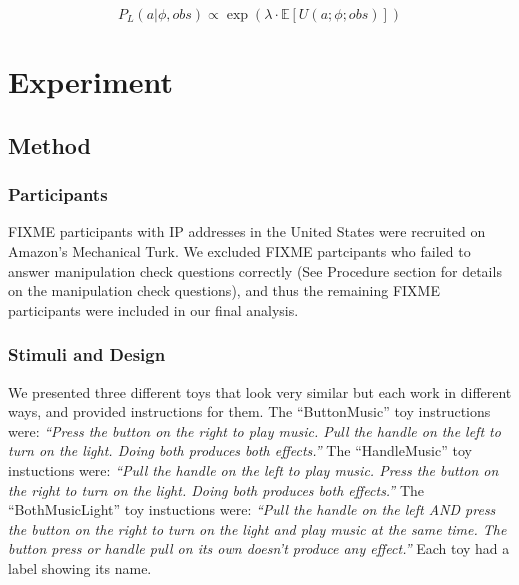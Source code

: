 \documentclass[10pt, letterpaper]{article}
\begin{document}
\[ P_L(a | \phi, obs) \propto \exp(\lambda \cdot \mathbb{E}[U(a;\phi; obs)])\]

\section{Experiment}\label{experiment}

\subsection{Method}\label{method}

\subsubsection{Participants}\label{participants}

FIXME participants with IP addresses in the United States were recruited
on Amazon's Mechanical Turk. We excluded FIXME partcipants who failed to
answer manipulation check questions correctly (See Procedure section for
details on the manipulation check questions), and thus the remaining
FIXME participants were included in our final analysis.

\subsubsection{Stimuli and Design}\label{stimuli-and-design}

We presented three different toys that look very similar but each work
in different ways, and provided instructions for them. The
``ButtonMusic'' toy instructions were: \emph{``Press the button on the
right to play music. Pull the handle on the left to turn on the light.
Doing both produces both effects.''} The ``HandleMusic'' toy instuctions
were: \emph{``Pull the handle on the left to play music. Press the
button on the right to turn on the light. Doing both produces both
effects.''} The ``BothMusicLight'' toy instuctions were: \emph{``Pull
the handle on the left AND press the button on the right to turn on the
light and play music at the same time. The button press or handle pull
on its own doesn't produce any effect.''} Each toy had a label showing
its name.
\end{document}
